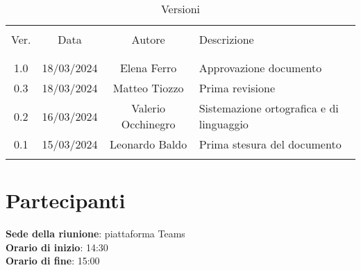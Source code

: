 \documentclass[italian,12pt]{article} %
\begin{document}


\newpage





\begin{table}[!h]
	\caption{Versioni}
	\begin{center}
		\begin{tabular}{ c c c p{9cm}}
			\hline \\[-2ex]
			Ver. & Data & Autore & Descrizione \\
			\\[-2ex] \hline \\[-1.5ex]
			1.0 & 18/03/2024 & Elena Ferro & Approvazione documento \\
			0.3 & 18/03/2024 & Matteo Tiozzo & Prima revisione \\
			0.2 & 16/03/2024 & Valerio Occhinegro& Sistemazione ortografica e di linguaggio \\
			0.1 & 15/03/2024 & Leonardo Baldo& Prima stesura del documento \\
			\\[-1.5ex] \hline
		\end{tabular}
	\end{center}
\end{table}
\newpage

\tableofcontents

\newpage

\section{Partecipanti}


\textbf{Sede della riunione}: piattaforma Teams\\
\textbf{Orario di inizio}: 14:30\\
\textbf{Orario di fine}: 15:00\\
\end{document}
